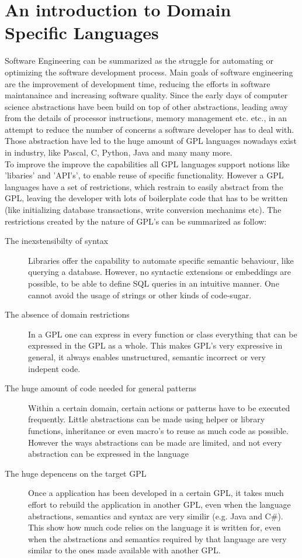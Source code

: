 \section[]{An introduction to Domain Specific Languages}
Software Engineering can be summarized as the struggle for automating or optimizing the software development process. Main goals of software engineering are the improvement of development time, reducing the efforts in software maintanaince and increasing software quality. Since the early days of computer science abstractions have been build on top of other abstractions, leading away from the details of processor instructions, memory management etc. etc., in an attempt to reduce the number of concerns a software developer has to deal with. Those abstraction have led to the huge amount of GPL languages nowadays exist in industry, like Pascal, C, Python, Java and many many more. 
\\
To improve the improve the capabilities all GPL languages support notions like 'libaries' and 'API's', to enable reuse of specific functionality. However a GPL languages have a set of restrictions, which restrain to easily abstract from the GPL, leaving the developer with lots of boilerplate code that has to be written (like initializing database transactions, write conversion mechanims etc). The restrictions created by the nature of GPL's can be summarized as follow:
\\
\begin{description}
	\item[The inexstensibilty of syntax]
	Libraries offer the capability to automate specific semantic behaviour, like querying a database. However, no syntactic extensions or embeddings are possible, to be able to define SQL queries in an intuitive manner. One cannot avoid the usage of strings or other kinds of code-sugar. 
	\item[The absence of domain restrictions]
	In a GPL one can express in every function or class everything that can be expressed in the GPL as a whole. This makes GPL's very expressive in general, it always enables unstructured, semantic incorrect or very indepent code.
	\item[The huge amount of code needed for general patterns]
	Within a certain domain, certain actions or patterns have to be executed frequently. Little abstractions can be made using helper or library functions, inheritance or even macro's to reuse as much code as possible. However the ways abstractions can be made are limited, and not every abstraction can be expressed in the language
	\item[The huge depencens on the target GPL]
	Once a application has been developed in a certain GPL, it takes much effort to rebuild the application in another GPL, even when the language abstractions, semantics and syntax are very similir (e.g. Java and C\#). This show how much code relies on the language it is written for, even when the abstractions and semantics required by that language are very similar to the ones made available with another GPL. 
\end{description}

